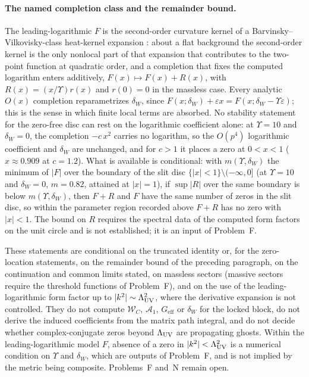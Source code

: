 \paragraph{The named completion class and the remainder bound.}
The leading-logarithmic \(F\) is the second-order curvature kernel
of a Barvinsky--Vilkovisky-class heat-kernel expansion
\cite{BarvinskyVilkovisky1990}: about a flat background the
second-order kernel is the only nonlocal part of that expansion
that contributes to the two-point function at quadratic order, and
a completion that fixes the computed logarithm enters additively,
\(F(x)\mapsto F(x)+R(x)\), with \(R(x)=(x/\Upsilon)r(x)\) and
\(r(0)=0\) in the massless case. Every analytic \(O(x)\) completion
reparametrizes \(\delta_W\), since
\(F(x;\delta_W)+\varepsilon x=F(x;\delta_W-\Upsilon\varepsilon)\);
this is the sense in which finite local terms are absorbed. No
stability statement for the zero-free disc can rest on the
logarithmic coefficient alone: at \(\Upsilon=10\) and
\(\delta_W=0\), the completion \(-c\,x^{2}\) carries no logarithm,
so the \(O(p^4)\) logarithmic coefficient and \(\delta_W\) are
unchanged, and for \(c>1\) it places a zero at \(0<x<1\)
(\(x\approx0.909\) at \(c=1.2\)). What is available is
conditional: with \(m(\Upsilon,\delta_W)\) the minimum of \(|F|\)
over the boundary of the slit disc
\(\{|x|<1\}\setminus(-\infty,0]\) (at \(\Upsilon=10\) and
\(\delta_W=0\), \(m=0.82\), attained at \(|x|=1\)), if
\(\sup|R|\) over the same boundary is below
\(m(\Upsilon,\delta_W)\), then \(F+R\) and \(F\) have the same
number of zeros in the slit disc, so within the parameter region
recorded above \(F+R\) has no zero with \(|x|<1\). The bound on
\(R\) requires the spectral data of the computed form factors on
the unit circle and is not established; it is an input of
Problem~F.


These statements are conditional on the truncated identity or, for
the zero-location statements, on the remainder bound of the preceding
paragraph, on the continuation and common limits stated, on massless
sectors (massive sectors require the threshold functions of Problem~F),
and on the use of the leading-logarithmic form factor up to
\(|k^2|\sim\Lambda_{\mathrm{UV}}^2\), where the derivative expansion is not
controlled. They do not compute
\(\mathcal W_C\), \(\mathcal A_1\), \(G_{\mathrm{eff}}\) or \(\delta_W\)
for the locked block, do not derive the induced coefficients from the
matrix path integral, and do not decide whether complex-conjugate zeros
beyond \(\Lambda_{\mathrm{UV}}\) are propagating ghosts. Within the leading-logarithmic
model \(F\), absence of a zero in \(|k^2|<\Lambda_{\mathrm{UV}}^2\) is a numerical
condition on \(\Upsilon\) and \(\delta_W\), which are outputs of
Problem~F, and is not implied by the metric being composite.
Problems~F and~N remain open.


